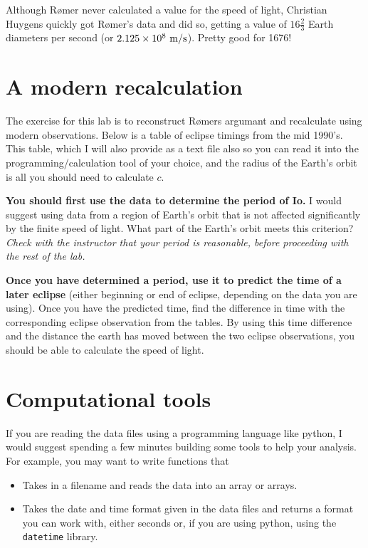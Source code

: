\documentclass{tufte-handout}
\begin{document}
Although R{\o}mer never calculated a value for the speed of light, Christian Huygens quickly got R{\o}mer's data and did so, getting a value of $16 \frac{2}{3}$ Earth diameters per second (or $2.125\times10^8~{\rm m}/{\rm s}$).  Pretty good for 1676!

\section{A modern recalculation}

The exercise for this lab is to reconstruct R{\o}mers argumant and recalculate using modern observations.  Below is a table of eclipse timings from the mid 1990's.  This table, which I will also provide as a text file also so you can read it into the programming/calculation tool of your choice, and the radius of the Earth's orbit is all you should need to calculate $c$.

{\bf You should first use the data to determine the period of Io.}  I would suggest using data from a region of Earth's orbit that is not affected significantly by the finite speed of light.  What part of the Earth's orbit meets this criterion? {\it Check with the instructor that your period is reasonable, before proceeding with the rest of the lab.}

{\bf Once you have determined a period, use it to predict the time of a later eclipse} (either beginning or end of eclipse, depending on the data you are using).  Once you have the predicted time, find the difference in time with the corresponding eclipse observation from the tables.  By using this time difference and the distance the earth has moved between the two eclipse observations, you should be able to calculate the speed of light.

\section{Computational tools}

If you are reading the data files using a programming language like python, I would suggest spending a few minutes building some tools to help your analysis. 
For example, you may want to write functions that
\begin{itemize}[itemsep=0pt,parsep=0pt,topsep=0pt,partopsep=0pt]
    \item Takes in a filename and reads the data into an array or arrays.
    \item Takes the date and time format given in the data files and returns a format you can work with, either seconds or, if you are using python, using the {\tt datetime} library.
\end{itemize}
\end{document}

